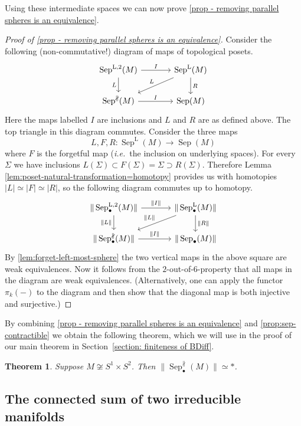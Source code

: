 \documentclass{amsart}
\theoremstyle{plain}
\newtheorem{thm}{Theorem}[section]
\theoremstyle{definition}
\DeclareMathOperator\sep{Sep} %
\newcommand{\sepNP}{\sep^{\nparallel}} %
\newcommand{\sepL}{\sep^{\mathrm{L}}} %
\newcommand{\sepLtwo}{\sep^{\mathrm{L},2}} %
\begin{document}
Using these intermediate spaces we can now prove \cref{prop - removing parallel spheres is an equivalence}.

\begin{proof}[Proof of \cref{prop - removing parallel spheres is an equivalence}]
Consider the following (non-commutative!) diagram of maps of topological posets.
\[
\begin{tikzcd}[column sep = large]
    \sepLtwo(M) \ar[r, "I"] \ar[d, "L"'] & \sepL(M) \ar[dl, "L"'] \ar[d, "R"] \\
    \sepNP(M) \ar[r, "I"] & \sep(M) 
\end{tikzcd}
\]
Here the maps labelled $I$ are inclusions and $L$ and $R$ are as defined above.
The top triangle in this diagram commutes.
Consider the three maps
\[
    L, F, R \colon \sepL(M) \longrightarrow \sep(M)
\]
where $F$ is the forgetful map (\emph{i.e.}~the inclusion on underlying spaces).
For every $\Sigma$ we have inclusions 
$L(\Sigma) \subset F(\Sigma) = \Sigma \supset R(\Sigma)$.
Therefore Lemma \ref{lem:poset-natural-transformation=homotopy} provides us with homotopies $|L| \simeq |F| \simeq |R|$, so the following diagram commutes up to homotopy.
\[
\begin{tikzcd}[column sep = large]
    {\|\sepLtwo_\bullet(M)\|} \ar[r, "{\|I\|}"] \ar[d, "{\|L\|}"'] & 
    {\|\sepL_\bullet(M)\|} \ar[dl, "{\|L\|}"'] \ar[d, "{\|R\|}"] \\
    {\|\sepNP_\bullet(M)\|} \ar[r, "{\|I\|}"] & 
    {\|\sep_\bullet(M)\|}
\end{tikzcd}
\]
By \cref{lem:forget-left-most-sphere} the two vertical maps in the above square are weak equivalences.
Now it follows from the $2$-out-of-$6$-property that all maps in the diagram are weak equivalences.
(Alternatively, one can apply the functor $\pi_k(-)$ to the diagram and then show that the diagonal map is both injective and surjective.)
\end{proof}

By combining \cref{prop - removing parallel spheres is an equivalence} and \cref{prop:sep-contractible} we obtain the following theorem, which we will use in the proof of our main theorem in Section~\ref{section: finiteness of BDiff}.

\begin{thm}\label{thm: sepNP contractible}
    Suppose $M\not\cong S^1 \times S^2$. Then $\|\sepNP_\bullet(M)\|\simeq *$.
\end{thm}


\subsection{The connected sum of two irreducible manifolds}\label{sec:M connected sum of two irreducible}
\end{document}
